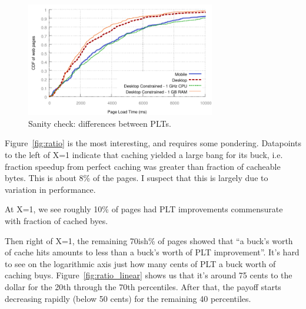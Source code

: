 \begin{figure}[t]
    \includegraphics[width=3.25in]{../graphs/plt_comparison/plt_differences.pdf}
    \caption[]{\label{fig:plt_comparison} Sanity check: differences between
    PLTs.}
\end{figure}

Figure~\ref{fig:ratio} is the most interesting, and requires some pondering.
Datapoints to the left of X=1 indicate that caching yielded a large
bang for its buck, i.e. fraction speedup from perfect caching was greater than fraction of
cacheable bytes. This is about 8\% of the pages. I suspect that this is
largely due to
variation in performance.

At X=1, we see roughly 10\% of pages had PLT improvements commensurate with
fraction of cached byes.

Then right of X=1, the remaining 70ish\% of pages showed that ``a buck's worth
of cache hits amounts to less than a buck's worth of PLT improvement''. It's
hard to see on the logarithmic axis just how many cents of PLT a buck worth of
caching buys. Figure~\ref{fig:ratio_linear} shows us that it's around 75 cents
to the dollar for the 20th through the 70th percentiles. After that, the
payoff starts decreasing rapidly (below 50 cents) for the remaining 40 percentiles.
